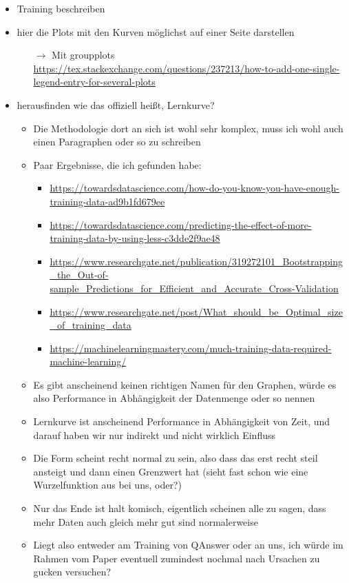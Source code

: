\documentclass[utf8,biblatex]{lni}
\begin{document}
\begin{itemize}
  \item Training beschreiben
  \item hier die Plots mit den Kurven möglichst auf einer Seite darstellen
  \begin{itemize}
    \item[$\rightarrow$] Mit groupplots \url{https://tex.stackexchange.com/questions/237213/how-to-add-one-single-legend-entry-for-several-plots}
  \end{itemize}
  \item herausfinden wie das offiziell heißt, Lernkurve?
  \begin{itemize}
    \item Die Methodologie dort an sich ist wohl sehr komplex, muss ich wohl auch einen Paragraphen oder so zu schreiben
    \item Paar Ergebnisse, die ich gefunden habe:
    \begin{itemize}
      \item \url{https://towardsdatascience.com/how-do-you-know-you-have-enough-training-data-ad9b1fd679ee}
      \item \url{https://towardsdatascience.com/predicting-the-effect-of-more-training-data-by-using-less-c3dde2f9ae48}
      \item \url{https://www.researchgate.net/publication/319272101\_Bootstrapping_the_Out-of-sample\_Predictions\_for\_Efficient\_and\_Accurate\_Cross-Validation}
      \item \url{https://www.researchgate.net/post/What\_should\_be\_Optimal\_size\_of\_training\_data}
      \item \url{https://machinelearningmastery.com/much-training-data-required-machine-learning/}
    \end{itemize}
    \item Es gibt anscheinend keinen richtigen Namen für den Graphen, würde es also Performance in Abhängigkeit der Datenmenge oder so nennen
    \item Lernkurve ist anscheinend Performance in Abhängigkeit von Zeit, und darauf haben wir nur indirekt und nicht wirklich Einfluss
    \item Die Form scheint recht normal zu sein, also dass das erst recht steil ansteigt und dann einen Grenzwert hat (sieht fast schon wie eine Wurzelfunktion aus bei uns, oder?)
    \item Nur das Ende ist halt komisch, eigentlich scheinen alle zu sagen, dass mehr Daten auch gleich mehr gut sind normalerweise
    \item Liegt also entweder am Training von QAnswer oder an uns, ich würde im Rahmen vom Paper eventuell zumindest nochmal nach Ursachen zu gucken versuchen?
  \end{itemize}
\end{itemize}
\end{document}
